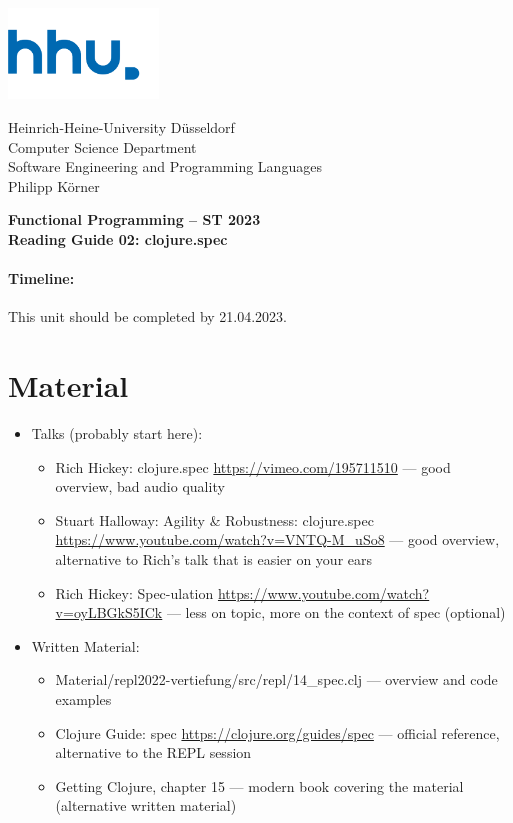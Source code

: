 \documentclass[11pt,a4paper]{article}
\begin{document}
\begin{minipage}[b]{\textwidth}
	\parbox[t]{5cm}{%
		\includegraphics[width=4cm]{unilogo}
		\hfill
	}
	\parbox[b]{11cm}{%
		Heinrich-Heine-University D\"usseldorf\\
		Computer Science Department\\
		Software Engineering and Programming Languages\\
		Philipp K\"orner
	}
\end{minipage}
\begin{center}
	\bf
	Functional Programming -- ST 2023\\
	Reading Guide 02: clojure.spec
\end{center}

\pagestyle{empty}

\paragraph{Timeline:} This unit should be completed by 21.04.2023.

\section{Material} 

\begin{itemize}
    \item Talks (probably start here):
    \begin{itemize}
	\item Rich Hickey: clojure.spec \url{https://vimeo.com/195711510} --- good overview, bad audio quality
	\item Stuart Halloway: Agility \& Robustness: clojure.spec \url{https://www.youtube.com/watch?v=VNTQ-M_uSo8} --- good overview, alternative to Rich's talk that is easier on your ears
    \item Rich Hickey: Spec-ulation \url{https://www.youtube.com/watch?v=oyLBGkS5ICk} --- less on topic, more on the context of spec (optional)
    \end{itemize}

    \item Written Material:
    \begin{itemize}
	\item Material/repl2022-vertiefung/src/repl/14\_spec.clj --- overview and code examples
	\item Clojure Guide: spec \url{https://clojure.org/guides/spec} --- official reference, alternative to the REPL session
    \item Getting Clojure, chapter 15 --- modern book covering the material (alternative written material)
    \end{itemize}

\end{itemize}
\end{document}
